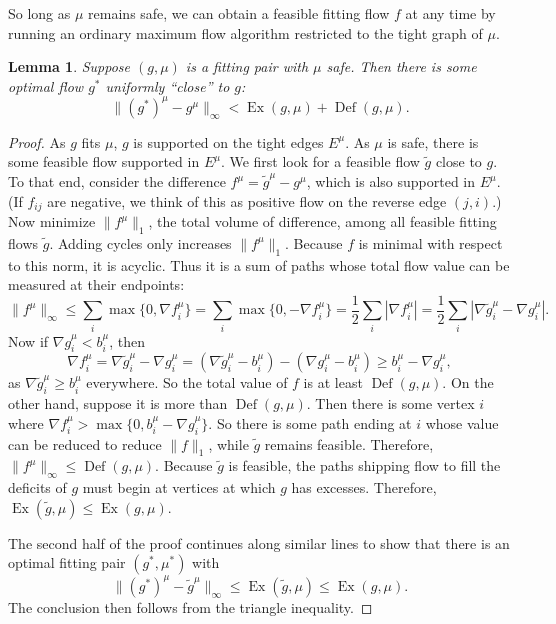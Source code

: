 \documentclass[11pt]{article}
\newtheorem{lemma}[theorem]{Lemma}
\theoremstyle{definition}
\theoremstyle{definition}
\newcommand{\fu}{f^{\mu}}
\newcommand{\nfiu}{\nabla \fu_i}
\newcommand{\biu}{b_{i}^{\mu}}
\DeclareMathOperator{\Ex}{Ex}
\DeclareMathOperator{\Def}{Def}
\begin{document}
    So long as $\mu$ remains safe, we can obtain a feasible fitting flow $f$ at any time
    by running an ordinary maximum flow algorithm restricted to the tight graph of $\mu$.
    
    \begin{lemma} \label{lem.bound-dist}
    Suppose $(g, \mu)$ is a fitting pair with $\mu$ safe. Then there is some optimal flow $g^*$
    uniformly ``close'' to $g$:
    \[ \|(g^*)^\mu - g^\mu\|_\infty < \Ex(g, \mu) + \Def(g, \mu). \]
    \end{lemma}
    \begin{proof}
    As $g$ fits $\mu$, $g$ is supported on the tight edges $E^\mu$. As
    $\mu$ is safe, there is some feasible flow supported in $E^\mu$. We first
    look for a feasible flow $\tilde{g}$ close to $g$. To that end, consider the
    difference $f^\mu = \tilde{g}^\mu - g^\mu$, which is also supported in $E^\mu$.
    (If $f_{ij}$ are negative, we think of this as positive flow on the reverse edge $(j, i)$.)
    Now minimize $\|f^\mu\|_1$, the total volume of difference,
    among all feasible fitting flows $\tilde{g}$. Adding cycles only increases $\|f^\mu\|_1$.
    Because $f$ is minimal with respect to this norm, it is acyclic. Thus it is a sum of
    paths whose total flow value can be measured at their endpoints:
    \[ \|f^\mu\|_\infty \leq \sum_i \max\{0, \nfiu\} = \sum_i \max\{0, -\nfiu\} = \frac{1}{2}\sum_i |\nfiu|
     = \frac{1}{2}\sum_i |\nabla \tilde{g}^\mu_i - \nabla g^\mu_i|. \]
    Now if $\nabla g_i^\mu < b_i^\mu$, then
    \[ \nfiu = \nabla \tilde{g}_i^\mu - \nabla g_i^\mu
     = (\nabla \tilde{g}_i^\mu - b_i^\mu) - (\nabla g_i^\mu - b_i^\mu) \geq b_i^\mu - \nabla g_i^\mu, \]
    as $\nabla \tilde{g}_i^\mu \geq b_i^\mu$ everywhere. So the total value of $f$ is at least
    $\Def(g, \mu)$. On the other hand, suppose it is more than $\Def(g, \mu)$. Then there
    is some vertex $i$ where $\nfiu > \max\{0, \biu - \nabla g_i^\mu\}$. So there is some path
    ending at $i$ whose value can be reduced to reduce $\|f\|_1$, while $\tilde{g}$
    remains feasible. Therefore, $\|f^\mu\|_\infty \leq \Def(g, \mu)$. Because $\tilde{g}$ is feasible,
    the paths shipping flow to fill the deficits of $g$ must begin at vertices at which $g$ has
    excesses. Therefore, $\Ex(\tilde{g}, \mu) \leq \Ex(g, \mu)$.
    
    The second half of the proof continues along similar lines to show that there is an optimal
    fitting pair $(g^*, \mu^*)$ with
    \[ \|(g^*)^\mu - \tilde{g}^\mu\|_\infty \leq \Ex(\tilde{g}, \mu) \leq \Ex(g, \mu). \]
    The conclusion then follows from the triangle inequality.
    
    \end{proof}
    
\end{document}
